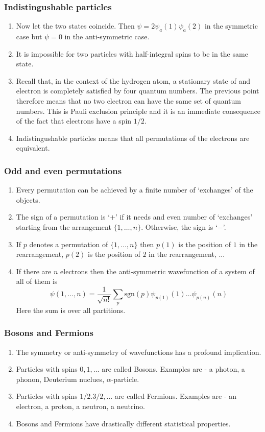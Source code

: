 \documentclass{beamer}
\begin{document}
\begin{frame}
\frametitle{Indistingushable particles}
\begin{enumerate}
\item Now let the two states coincide. Then $\psi = 2\psi_a(1)\psi_a(2)$ in the
symmetric case but $\psi = 0$ in the anti-symmetric case.
\item It is impossible for two particles with half-integral spins to be in the 
same state.
\item Recall that, in the context of the hydrogen atom, a stationary state of
and electron is completely satisfied by four quantum numbers. The previous point
therefore means that no two electron can have the same set of quantum numbers.
This is Pauli exclusion principle and it is an immediate consequence of the fact
that electrons have a spin $1/2$.
\item Indistingushable particles means that all permutations of the electrons 
are equivalent.
\end{enumerate}
\end{frame}

\begin{frame}
\frametitle{Odd and even permutations}
\begin{enumerate}
\item Every permutation can be achieved by a finite number of `exchanges' of the
objects.
\item The sign of a permutation is `$+$' if it needs and even number of `exchanges'
starting from the arrangement $\{1, \ldots, n\}$. Otherwise, the sign is `$-$'. 
\item If $p$ denotes a permutation of $\{1, \ldots, n\}$ then $p(1)$ is the 
position of $1$ in the rearrangement, $p(2)$ is the position of $2$ in the 
rearrangement, ...
\item If there are $n$ electrons then the anti-symmetric wavefunction of a system
of all of them is
\begin{equation}\label{e6}
\psi(1, \ldots, n) = \frac{1}{\sqrt{n!}}
 \sum_{p}\text{sgn}(p)\psi_{p(1)}(1)\ldots\psi_{p(n)}(n)
\end{equation}
Here the sum is over all partitions.
\end{enumerate}
\end{frame}

\begin{frame}
\frametitle{Bosons and Fermions}
\begin{enumerate}
\item The symmetry or anti-symmetry of wavefunctions has a profound implication.
\item Particles with spins $0, 1, \ldots$ are called Bosons. Examples are - a
photon, a phonon, Deuterium nuclues, $\alpha$-particle.
\item Particles with spins $1/2. 3/2, \ldots$ are called Fermions. Examples are
- an electron, a proton, a neutron, a neutrino.
\item Bosons and Fermions have drastically different statistical properties.
\end{enumerate}
\end{frame}
\end{document}
